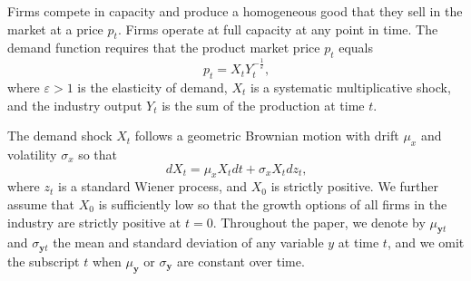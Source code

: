 \documentclass[nogrid,nosurname,sort&compress]{RFS}
\begin{document}
Firms compete in capacity and produce a homogeneous good that they sell in the market at a price
$p_{t}$. Firms operate at full capacity at any point in time. The demand function requires that
the product market price $p_{t}$ equals
\begin{equation}
p_{t}=X_{t}Y_{t}^{-\frac{1}{\varepsilon }}\text{,}  \label{tax}
\end{equation}
where $\varepsilon >1$ is the elasticity of demand, $X_{t}$ is a systematic multiplicative shock,
and the industry output $Y_{t}$ is the sum of the production at time $t$.

The demand shock $X_{t}$ follows a geometric Brownian motion with drift $\mu _{x}$ and volatility
$\sigma _{x}$ so that
\begin{equation}
dX_{t}=\mu _{x}X_{t}dt+\sigma _{x}X_{t}dz_{t}\text{,}  \label{demand}
\end{equation}
where $z_{t}$ is a standard Wiener process, and $X_{0}$ is strictly positive. We further assume
that $X_{0}$ is sufficiently low so that the growth options of all firms in the industry are
strictly positive at $t=0$. Throughout the paper, we denote by $\mu _{\mathbf{y}t}$ and $\sigma
_{\mathbf{y}t}$ the mean and standard deviation of any variable $y$ at time $t$, and we omit the
subscript $t$ when $\mu _{\mathbf{y}}$ or $\sigma _{\mathbf{y}}$ are constant over time.
\end{document}
